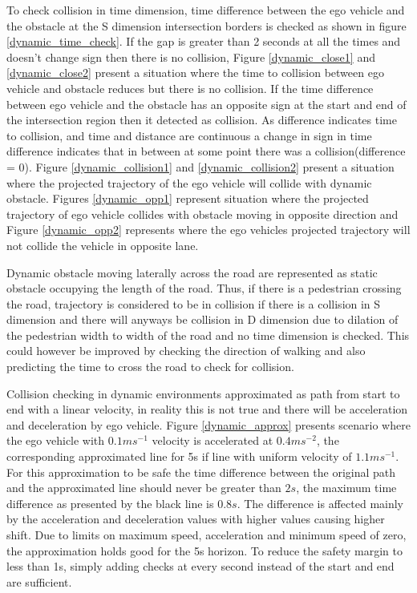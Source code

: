 To check collision in time dimension, time difference between the ego vehicle and the obstacle at the S dimension intersection borders is checked as shown in figure \ref{dynamic_time_check}. If the gap is greater than 2 seconds at all the times and doesn't change sign then there is no collision, Figure \ref{dynamic_close1} and \ref{dynamic_close2} present a situation where the time to collision between ego vehicle and obstacle reduces but there is no collision. If the time difference between ego vehicle and the obstacle has an opposite sign at the start and end of the intersection region then it detected as collision. As difference indicates time to collision, and time and distance are continuous a change in sign in time difference indicates that in between at some point there was a collision(difference = 0). Figure \ref{dynamic_collision1} and \ref{dynamic_collision2} present a situation where the projected trajectory of the ego vehicle will collide with dynamic obstacle. Figures \ref{dynamic_opp1} represent situation where the projected trajectory of ego vehicle collides with obstacle moving in opposite direction and Figure \ref{dynamic_opp2} represents where the ego vehicles projected trajectory will not collide the vehicle in opposite lane.

Dynamic obstacle moving laterally across the road are represented as static obstacle occupying the length of the road. Thus, if there is a pedestrian crossing the road, trajectory is considered to be in collision if there is a collision in S dimension and there will anyways be collision in D dimension due to dilation of the pedestrian width to width of the road and no time dimension is checked. This could however be improved by checking the direction of walking and also predicting the time to cross the road to check for collision. 

Collision checking in dynamic environments approximated as path from start to end with a linear velocity, in reality this is not true and there will be acceleration and deceleration by ego vehicle. Figure \ref{dynamic_approx} presents scenario where the ego vehicle with $0.1ms^{-1}$ velocity is accelerated at $0.4ms^{-2}$, the corresponding approximated line for 5s if line with uniform velocity of $1.1ms^{-1}$. For this approximation to be safe the time difference between the original path and the approximated line should never be greater than $2s$, the maximum time difference as presented by the black line is $0.8s$. The difference is affected mainly by the acceleration and deceleration values with higher values causing higher shift. Due to limits on maximum speed, acceleration and minimum speed of zero, the approximation holds good for the 5s horizon. To reduce the safety margin to less than 1s, simply adding checks at every second instead of the start and end are sufficient. 

